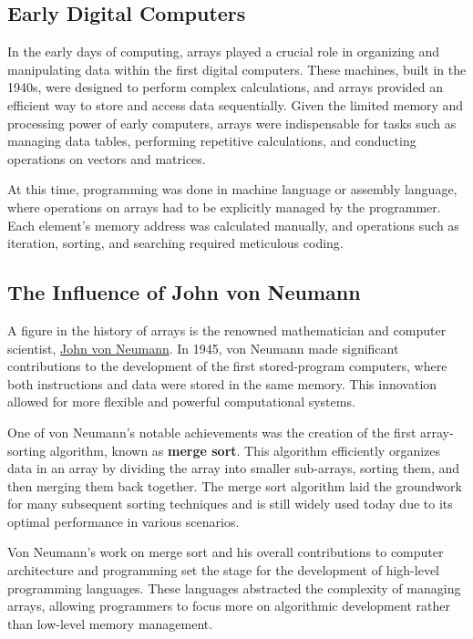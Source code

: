 \documentclass{book}
\begin{document}
	\subsection{Early Digital Computers}
	
	In the early days of computing, arrays played a crucial role in organizing and manipulating data within the first digital computers. These machines, built in the 1940s, were designed to perform complex calculations, and arrays provided an efficient way to store and access data sequentially. Given the limited memory and processing power of early computers, arrays were indispensable for tasks such as managing data tables, performing repetitive calculations, and conducting operations on vectors and matrices.
	
	At this time, programming was done in machine language or assembly language, where operations on arrays had to be explicitly managed by the programmer. Each element's memory address was calculated manually, and operations such as iteration, sorting, and searching required meticulous coding.
	
	\subsection{The Influence of John von Neumann}
	
	A figure in the history of arrays is the renowned mathematician and computer scientist, \href{https://en.wikipedia.org/wiki/John_von_Neumann#Computer_science}{John von Neumann}. In 1945, von Neumann made significant contributions to the development of the first stored-program computers, where both instructions and data were stored in the same memory. This innovation allowed for more flexible and powerful computational systems.
	
	One of von Neumann's notable achievements was the creation of the first array-sorting algorithm, known as \textbf{merge sort}. This algorithm efficiently organizes data in an array by dividing the array into smaller sub-arrays, sorting them, and then merging them back together. The merge sort algorithm laid the groundwork for many subsequent sorting techniques and is still widely used today due to its optimal performance in various scenarios.
	
	Von Neumann’s work on merge sort and his overall contributions to computer architecture and programming set the stage for the development of high-level programming languages. These languages abstracted the complexity of managing arrays, allowing programmers to focus more on algorithmic development rather than low-level memory management.
	
\end{document}
